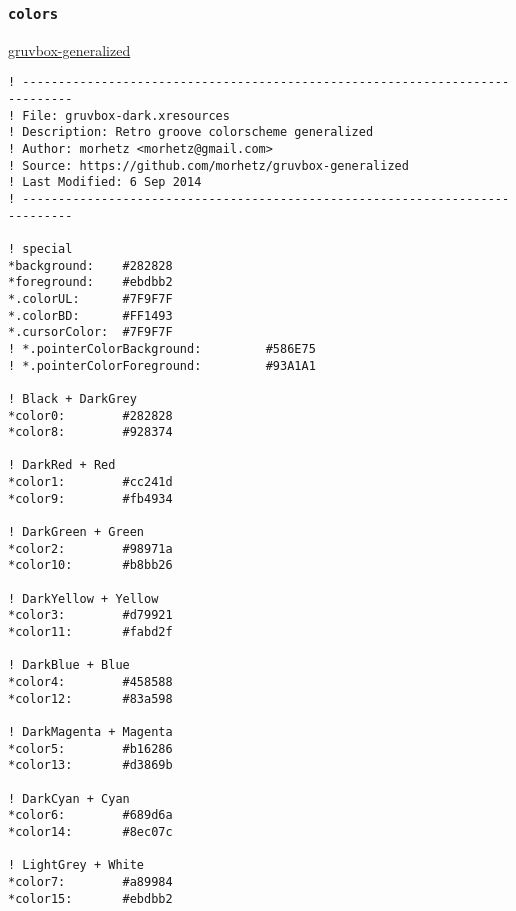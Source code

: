 \documentclass[11pt]{article}
\begin{document}
\subsubsection{\texttt{colors}}
\label{sec:orgd015990}

\href{https://github.com/morhetz/gruvbox-generalized}{gruvbox-generalized}

\lstset{language=conf-xdefaults,label= ,caption= ,captionpos=b,numbers=none}
\begin{lstlisting}
! -----------------------------------------------------------------------------
! File: gruvbox-dark.xresources
! Description: Retro groove colorscheme generalized
! Author: morhetz <morhetz@gmail.com>
! Source: https://github.com/morhetz/gruvbox-generalized
! Last Modified: 6 Sep 2014
! -----------------------------------------------------------------------------

! special
*background:    #282828
*foreground:    #ebdbb2
*.colorUL:      #7F9F7F
*.colorBD:      #FF1493
*.cursorColor:  #7F9F7F
! *.pointerColorBackground:         #586E75
! *.pointerColorForeground:         #93A1A1

! Black + DarkGrey
*color0:        #282828
*color8:        #928374

! DarkRed + Red
*color1:        #cc241d
*color9:        #fb4934

! DarkGreen + Green
*color2:        #98971a
*color10:       #b8bb26

! DarkYellow + Yellow
*color3:        #d79921
*color11:       #fabd2f

! DarkBlue + Blue
*color4:        #458588
*color12:       #83a598

! DarkMagenta + Magenta
*color5:        #b16286
*color13:       #d3869b

! DarkCyan + Cyan
*color6:        #689d6a
*color14:       #8ec07c

! LightGrey + White
*color7:        #a89984
*color15:       #ebdbb2
\end{lstlisting}
\end{document}
